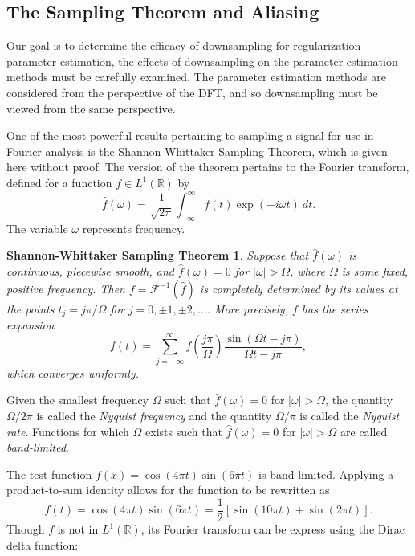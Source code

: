 \documentclass[12pt]{article}
\newtheorem*{SWST}{Shannon-Whittaker Sampling Theorem}
\begin{document}
\subsection{The Sampling Theorem and Aliasing} \label{sec:The Sampling Theorem and Aliasing}
Our goal is to determine the efficacy of downsampling for regularization parameter estimation, the effects of downsampling on the parameter estimation methods must be carefully examined. The parameter estimation methods are considered from the perspective of the DFT, and so downsampling must be viewed from the same perspective. \par 
One of the most powerful results pertaining to sampling a signal for use in Fourier analysis is the Shannon-Whittaker Sampling Theorem, which is given here without proof. The version of the theorem pertains to the Fourier transform, defined for a function $f \in L^1(\mathbb{R})$ by
\begin{equation}
\widehat{f}(\omega) = \frac{1}{\sqrt{2\pi}}\int_{-\infty}^{\infty} f(t)\exp(-i\omega{t})\: dt. 
\label{eq:FourierTransform}
\end{equation}
The variable $\omega$ represents frequency. 
\begin{SWST}
Suppose that $\widehat{f}(\omega)$ is continuous, piecewise smooth, and $\widehat{f}(\omega) = 0$ for $|\omega| > \Omega$, where $\Omega$ is some fixed, positive frequency. Then $f = \mathcal{F}^{-1}(\widehat{f})$ is completely determined by its values at the points $t_j = j\pi/\Omega$ for $j = 0,\pm 1,\pm 2,\ldots$. More precisely, $f$ has the series expansion
\[f(t) = \sum_{j=-\infty}^{\infty} f\left(\frac{j\pi}{\Omega}\right)\frac{\sin(\Omega{t}-j\pi)}{\Omega{t}-j\pi},\]
which converges uniformly. 
\end{SWST}
Given the smallest frequency $\Omega$ such that $\widehat{f}(\omega) = 0$ for $|\omega| > \Omega$, the quantity $\Omega/2\pi$ is called the \textit{Nyquist frequency} and the quantity $\Omega/\pi$ is called the \textit{Nyquist rate}. Functions for which $\Omega$ exists such that $\widehat{f}(\omega) = 0$ for $|\omega| > \Omega$ are called \textit{band-limited}. \par 
The test function $f(x) = \cos(4\pi{t})\sin(6\pi{t})$ is band-limited. Applying a product-to-sum identity allows for the function to be rewritten as
\begin{equation}
f(t) = \cos(4\pi{t})\sin(6\pi{t}) = \frac{1}{2}\left[\sin(10\pi{t}) + \sin(2\pi{t})\right].
\label{eq:Test Function 1}
\end{equation}
Though $f$ is not in $L^1(\mathbb{R})$, its Fourier transform can be express using the Dirac delta function:
\end{document}
